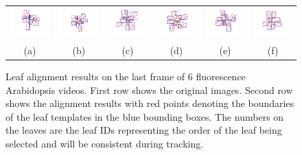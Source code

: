 \begin{figure}
\begin{centering}
\begin{tabular}{c c c c c c}
\includegraphics[trim= 90 60 100 5, clip, width=.11\textwidth]{Figures/AlignPerformance/9_2}&
\includegraphics[trim= 90 60 100 5, clip, width=.11\textwidth]{Figures/AlignPerformance/10_2}&
\includegraphics[trim= 90 60 100 5, clip, width=.11\textwidth]{Figures/AlignPerformance/11_2}&
\includegraphics[trim= 90 60 100 5, clip, width=.11\textwidth]{Figures/AlignPerformance/12_2}&
\includegraphics[trim= 90 60 100 5, clip, width=.11\textwidth]{Figures/AlignPerformance/14_2}&
\includegraphics[trim= 90 60 100 5, clip, width=.11\textwidth]{Figures/AlignPerformance/15_2}\\
(a) & (b) & (c) & (d) & (e) & (f) \\
\end{tabular}
\caption{Leaf alignment results on the last frame of $6$ fluorescence Arabidopsis videos. First row shows the original images. Second row shows the alignment results with red points denoting the boundaries of the leaf templates in the blue bounding boxes. The numbers on the leaves are the leaf IDs representing the order of the leaf being selected and will be consistent during tracking.}
\label{fig:alignResult}
\end{centering}
\end{figure}



